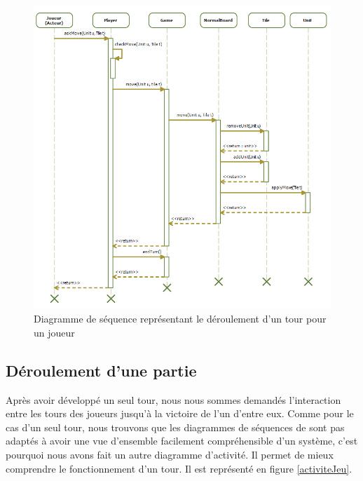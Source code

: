 \begin{figure}[!h] 
\centerline{\includegraphics[width=\textwidth]{img/sequence_tour_ex.png}}
   \caption{\label{étiquette} Diagramme de séquence représentant le déroulement d'un tour pour un joueur}
\label{sequenceTour}
\end{figure}

\subsection{Déroulement d'une partie}
Après avoir développé un seul tour, nous nous sommes demandés l'interaction entre les tours des joueurs jusqu'à la victoire de l'un d'entre eux. Comme pour le cas d'un seul tour, nous trouvons que les diagrammes de séquences de sont pas adaptés à avoir une vue d'ensemble facilement compréhensible d'un système, c'est pourquoi nous avons fait un autre diagramme d'activité. Il permet de mieux comprendre le fonctionnement d'un tour. Il est représenté en figure \ref{activiteJeu}.\\

